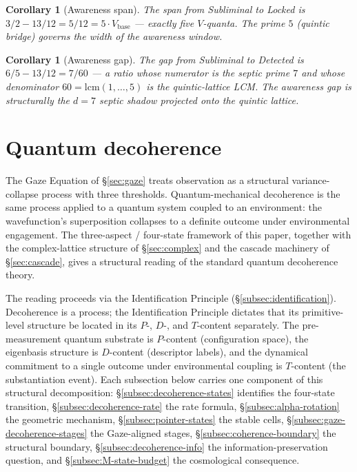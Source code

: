 \documentclass[11pt,a4paper]{article}
\newtheorem{corollary}[theorem]{Corollary}
\theoremstyle{definition}
\theoremstyle{remark}
\begin{document}
\begin{corollary}[Awareness span]\label{cor:awareness-span}
The span from Subliminal to Locked is $3/2 - 13/12 = 5/12 = 5\cdot V_{\mathrm{base}}$ --- exactly five $V$-quanta. The prime $5$ (quintic bridge) governs the width of the awareness window.
\end{corollary}

\begin{corollary}[Awareness gap]\label{cor:awareness-gap}
The gap from Subliminal to Detected is $6/5 - 13/12 = 7/60$ --- a ratio whose numerator is the septic prime $7$ and whose denominator $60 = \mathrm{lcm}(1,\ldots,5)$ is the quintic-lattice LCM. The awareness gap is structurally the $d=7$ septic shadow projected onto the quintic lattice.
\end{corollary}

\section{Quantum decoherence}\label{sec:decoherence}

The Gaze Equation of \S\ref{sec:gaze} treats observation as a structural variance-collapse process with three thresholds. Quantum-mechanical decoherence is the same process applied to a quantum system coupled to an environment: the wavefunction's superposition collapses to a definite outcome under environmental engagement. The three-aspect / four-state framework of this paper, together with the complex-lattice structure of \S\ref{sec:complex} and the cascade machinery of \S\ref{sec:cascade}, gives a structural reading of the standard quantum decoherence theory.

The reading proceeds via the Identification Principle (\S\ref{subsec:identification}). Decoherence is a process; the Identification Principle dictates that its primitive-level structure be located in its $P$-, $D$-, and $T$-content separately. The pre-measurement quantum substrate is $P$-content (configuration space), the eigenbasis structure is $D$-content (descriptor labels), and the dynamical commitment to a single outcome under environmental coupling is $T$-content (the substantiation event). Each subsection below carries one component of this structural decomposition: \S\ref{subsec:decoherence-states} identifies the four-state transition, \S\ref{subsec:decoherence-rate} the rate formula, \S\ref{subsec:alpha-rotation} the geometric mechanism, \S\ref{subsec:pointer-states} the stable cells, \S\ref{subsec:gaze-decoherence-stages} the Gaze-aligned stages, \S\ref{subsec:coherence-boundary} the structural boundary, \S\ref{subsec:decoherence-info} the information-preservation question, and \S\ref{subsec:M-state-budget} the cosmological consequence.
\end{document}
